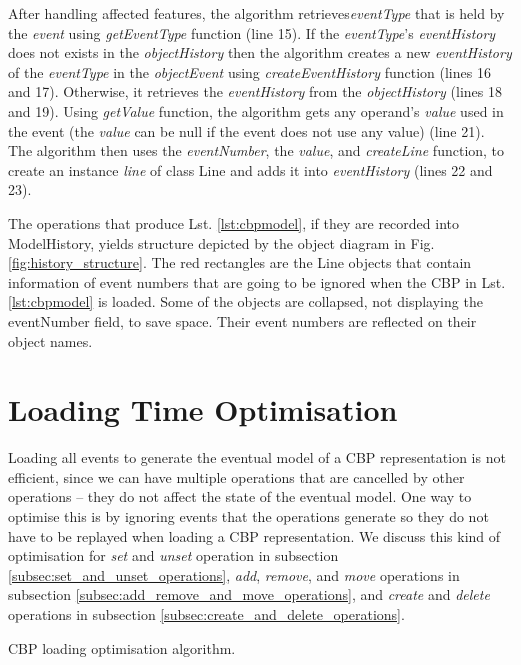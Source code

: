 \documentclass{llncs}
\begin{document}
After handling affected features, the algorithm retrieves\emph{eventType} that is held by the \emph{event} using \emph{getEventType} function (line 15). If the \emph{eventType}'s \emph{eventHistory} does not exists in the \emph{objectHistory} then the algorithm creates a new \emph{eventHistory} of the \emph{eventType} in the \emph{objectEvent}  using \emph{createEventHistory} function (lines 16 and 17). Otherwise, it retrieves the \emph{eventHistory} from the \emph{objectHistory} (lines 18 and 19). Using \emph{getValue} function, the algorithm gets any operand's \emph{value} used in the event (the \emph{value} can be null if the event does not use any value) (line 21). The algorithm then uses the \emph{eventNumber}, the \emph{value}, and \emph{createLine} function, to create an instance \emph{line} of class Line and adds it into \emph{eventHistory} (lines 22 and 23).   

The operations that produce Lst. \ref{lst:cbpmodel}, if they are recorded into ModelHistory, yields structure depicted by the object diagram in Fig. \ref{fig:history_structure}. The red rectangles are the Line objects that contain information of event numbers that are going to be ignored when the CBP in Lst. \ref{lst:cbpmodel} is loaded. Some of the objects are collapsed, not displaying the eventNumber field, to save space. Their event numbers are reflected on their object names.  

\section{Loading Time Optimisation}
\label{sec:loading_time_optimisation}
Loading all events to generate the eventual model of a CBP representation is not efficient, since we can have multiple operations that are cancelled by other operations -- they do not affect the state of the eventual model. One way to optimise this is by ignoring events that the operations generate so they do not have to be replayed when loading a CBP representation. We discuss this kind of optimisation for \emph{set} and \emph{unset} operation in subsection \ref{subsec:set_and_unset_operations}, \emph{add}, \emph{remove}, and \emph{move} operations in subsection \ref{subsec:add_remove_and_move_operations}, and \emph{create} and \emph{delete} operations in subsection \ref{subsec:create_and_delete_operations}.

\begin{algorithm}
\begin{small}
\end{small}
\caption{CBP loading optimisation algorithm.}
\label{alg:optimised_load}
\end{algorithm}
\end{document}
